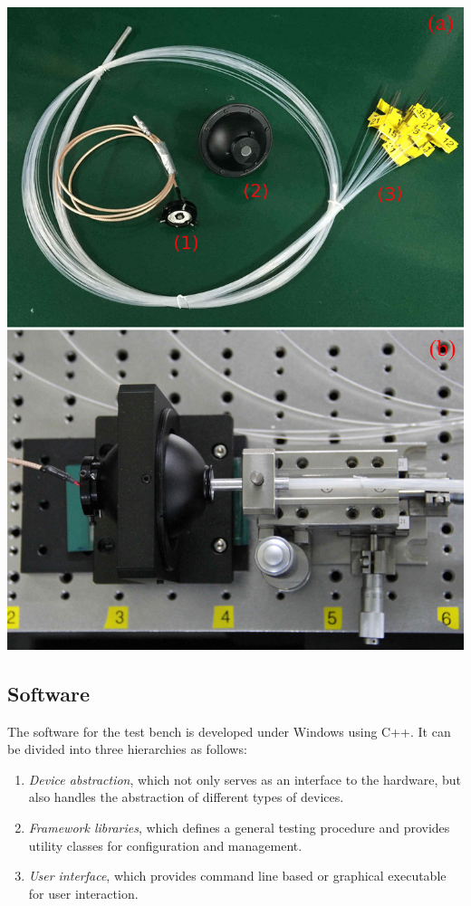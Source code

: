\documentclass[a4paper,10pt,twoside]{cpc-hepnp}
\begin{document}
\begin{CJK*}{UTF8}{gbsn}
\begin{multicols}{2}
\begin{center}
	\includegraphics[width=\linewidth]{FIG3}
\end{center} 

\subsection{Software}
\label{sec:software}

The software for the test bench is developed under Windows using C++. It can be divided into three hierarchies as follows:
\begin{enumerate}
	\item \textit{Device abstraction}, which not only serves as an interface to the hardware, but also handles the abstraction of different types of devices. 
	\item \textit{Framework libraries}, which defines a general testing procedure and provides utility classes for configuration and management.
	\item \textit{User interface}, which provides command line based or graphical executable for user interaction. 
\end{enumerate}


\end{multicols}
\end{CJK*}
\end{document}
